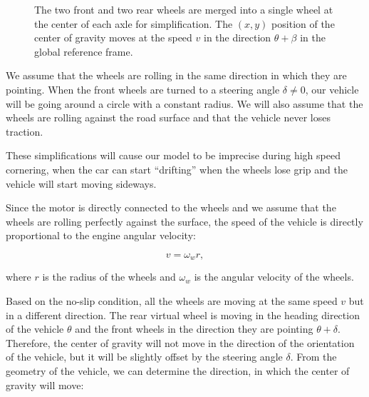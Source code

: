 \begin{figure}[p]
	
	\caption{The two front and two rear wheels are merged into a single wheel at the center of each axle for simplification. The $(x,y)$ position of the center of gravity moves at the speed $v$ in the direction $\theta+\beta$ in the global reference frame.}
	\label{fig:kinematic_bicycle}
\end{figure}

We assume that the wheels are rolling in the same direction in which they are pointing. When the front wheels are turned to a steering angle $\delta\neq 0$, our vehicle will be going around a circle with a constant radius. We will also assume that the wheels are rolling against the road surface and that the vehicle never loses traction.

These simplifications will cause our model to be imprecise during high speed cornering, when the car can start ``drifting'' when the wheels lose grip and the vehicle will start moving sideways.

Since the motor is directly connected to the wheels and we assume that the wheels are rolling perfectly against the surface, the speed of the vehicle is directly proportional to the engine angular velocity:

\begin{equation*}
v=\omega_w r,
\end{equation*}

where $r$ is the radius of the wheels and $\omega_w$ is the angular velocity of the wheels.

Based on the no-slip condition, all the wheels are moving at the same speed $v$ but in a different direction. The rear virtual wheel is moving in the heading direction of the vehicle $\theta$ and the front wheels in the direction they are pointing $\theta + \delta$. Therefore, the center of gravity will not move in the direction of the orientation of the vehicle, but it will be slightly offset by the steering angle $\delta$. From the geometry of the vehicle, we can determine the direction, in which the center of gravity will move:


